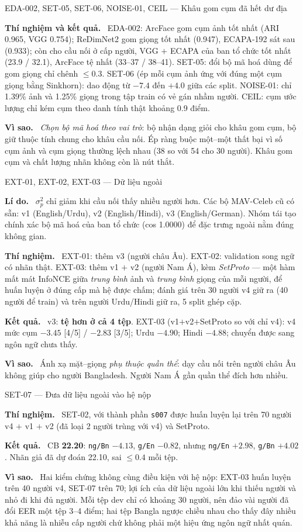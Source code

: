 \documentclass[11pt,a4paper,oneside]{report}
\newcommand{\up}[1]{\textbf{\color{good}#1}}
\newcommand{\down}[1]{\textbf{\color{bad}#1}}
\newcommand{\id}[1]{\texttt{#1}}
\newcommand{\field}[1]{\par\smallskip\textbf{\color{accent}#1.}~}
\begin{document}
\begin{expbox}{EDA-002, SET-05, SET-06, NOISE-01, CEIL --- Khâu gom cụm đã hết dư địa}
\field{Thí nghiệm và kết quả} EDA-002: ArcFace gom cụm ảnh tốt nhất (ARI 0.965, VGG 0.754); ReDimNet2 gom giọng tốt nhất (0.947), ECAPA-192 sát sau (0.933); còn cho cầu nối ở cấp người, VGG $+$ ECAPA của ban tổ chức tốt nhất (23.9 / 32.1), ArcFace tệ nhất (33--37 / 38--41). SET-05: đổi bộ mã hoá dùng để gom giọng chỉ chênh $\le0.3$. SET-06 (ép mỗi cụm ảnh ứng với đúng một cụm giọng bằng Sinkhorn): dao động từ $-7.4$ đến $+4.0$ giữa các split. NOISE-01: chỉ 1.39\% ảnh và 1.25\% giọng trong tập train có vẻ gán nhầm người. CEIL: cụm ước lượng chỉ kém cụm theo danh tính thật khoảng 0.9 điểm.
\field{Vì sao} \emph{Chọn bộ mã hoá theo vai trò}: bộ nhận dạng giỏi cho khâu gom cụm, bộ giữ thuộc tính chung cho khâu cầu nối. Ép ràng buộc một--một thất bại vì số cụm ảnh và cụm giọng thường lệch nhau (38 so với 54 cho 30 người). Khâu gom cụm và chất lượng nhãn không còn là nút thắt.
\end{expbox}

\begin{expbox}{EXT-01, EXT-02, EXT-03 --- Dữ liệu ngoài}
\field{Lí do} $\sigma_p^2$ chỉ giảm khi cầu nối thấy nhiều người hơn. Các bộ MAV-Celeb cũ có sẵn: v1 (English/Urdu), v2 (English/Hindi), v3 (English/German). Nhóm tái tạo chính xác bộ mã hoá của ban tổ chức (cos 1.0000) để đặc trưng ngoài nằm đúng không gian.
\field{Thí nghiệm} EXT-01: thêm v3 (người châu Âu). EXT-02: validation song ngữ có nhãn thật. EXT-03: thêm v1 $+$ v2 (người Nam Á), kèm \emph{SetProto} --- một hàm mất mát InfoNCE giữa \emph{trung bình} ảnh và \emph{trung bình} giọng của mỗi người, để huấn luyện ở đúng cấp mà hệ được chấm; đánh giá trên 30 người v4 giữ ra (40 người để train) và trên người Urdu/Hindi giữ ra, 5 split ghép cặp.
\field{Kết quả} v3: \down{tệ hơn ở cả 4 tệp}. EXT-03 (v1$+$v2$+$SetProto so với chỉ v4): v4 mức cụm \up{$-3.45$} [4/5] / \up{$-2.83$} [3/5]; Urdu $-4.90$; Hindi $-4.88$; chuyển được sang ngôn ngữ chưa thấy.
\field{Vì sao} Ánh xạ mặt--giọng \emph{phụ thuộc quần thể}: dạy cầu nối trên người châu Âu không giúp cho người Bangladesh. Người Nam Á gần quần thể đích hơn nhiều.
\end{expbox}

\begin{expbox}{SET-07 --- Đưa dữ liệu ngoài vào hệ nộp}
\field{Thí nghiệm} SET-02, với thành phần \id{s007} được huấn luyện lại trên 70 người v4 $+$ v1 $+$ v2 (đã loại 2 người trùng với v4) và SetProto.
\field{Kết quả} CB \down{22.20}: \id{ng/Bn} \up{$-4.13$}, \id{g/En} \up{$-0.82$}, nhưng \id{ng/En} \down{$+2.98$}, \id{g/Bn} \down{$+4.02$}. Nhãn giả đã dự đoán 22.10, sai $\le0.4$ mỗi tệp.
\field{Vì sao} Hai kiểm chứng không cùng điều kiện với hệ nộp: EXT-03 huấn luyện trên 40 người v4, SET-07 trên 70; lợi ích của dữ liệu ngoài lớn khi thiếu người và nhỏ đi khi đủ người. Mỗi tệp dev chỉ có khoảng 30 người, nên đảo vài người đã đổi EER một tệp 3--4 điểm; hai tệp Bangla ngược chiều nhau cho thấy đây nhiều khả năng là nhiễu cấp người chứ không phải một hiệu ứng ngôn ngữ nhất quán.
\end{expbox}
\end{document}
